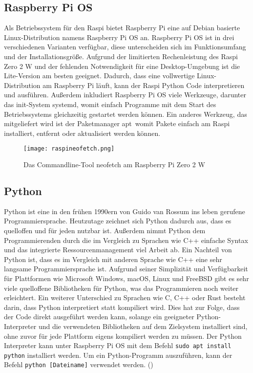 \subsection{Raspberry Pi OS}
\label{subsec:tRasPiOS}
Als Betriebssystem für den \ac{Raspi} bietet Raspberry Pi eine auf Debian basierte Linux-Distribution namens Raspberry Pi \ac{OS} an. Raspberry Pi \ac{OS} ist in drei verschiedenen Varianten verfügbar, diese unterscheiden sich im Funktionsumfang und der Installationsgröße. Aufgrund der limitierten Rechenleistung des \ac{Raspi} Zero 2 W und der fehlenden Notwendigkeit für eine Desktop-Umgebung ist die Lite-Version am besten geeignet. Dadurch, dass eine vollwertige Linux-Distribution am Raspberry Pi läuft, kann der \ac{Raspi} Python Code interpretieren und ausführen. Außerdem inkludiert Raspberry Pi OS viele Werkzeuge, darunter das init-System \glqq systemd\grqq , womit einfach Programme mit dem Start des Betriebssystems gleichzeitig gestartet werden können. Ein anderes Werkzeug, das mitgeliefert wird ist der Paketmanager \glqq apt\grqq\ womit Pakete einfach am \ac{Raspi} installiert, entfernt oder aktualisiert werden können.
\begin{figure}[h]
\centering
\texttt{[image: raspineofetch.png]}
\caption{Das Commandline-Tool neofetch am Raspberry Pi Zero 2 W}
\label{fig:pineofetch}
\end{figure}

\subsection{Python}
\label{subsec:tPython}
Python ist eine in den frühen 1990ern von Guido van Rossum ins leben gerufene Programmiersprache. Heutzutage zeichnet sich Python dadurch aus, dass es quelloffen und für jeden nutzbar ist. Außerdem nimmt Python dem Programmierenden durch die im Vergleich zu Sprachen wie C++ einfache Syntax und das integrierte Ressourcenmanagement viel Arbeit ab. Ein Nachteil von Python ist, dass es im Vergleich mit anderen Sprache wie C++ eine sehr langsame Programmiersprache ist. Aufgrund seiner Simplizität und Verfügbarkeit für Plattformen wie Microsoft Windows, macOS, Linux und FreeBSD gibt es sehr viele quelloffene Bibliotheken für Python, was das Programmieren noch weiter erleichtert. Ein weiterer Unterschied zu Sprachen wie C, C++ oder Rust besteht darin, dass Python interpretiert statt kompiliert wird. Dies hat zur Folge, dass der Code direkt ausgeführt werden kann, solange ein geeigneter Python-Interpreter und die verwendeten Bibliotheken auf dem Zielsystem installiert sind, ohne zuvor für jede Plattform eigens kompiliert werden zu müssen. Der Python Interpreter kann unter Raspberry Pi OS mit dem Befehl \verb|sudo apt install python| installiert werden. Um ein Python-Programm auszuführen, kann der Befehl \verb|python [Dateiname]| verwendet werden.
(\cite{matthes-2019})

